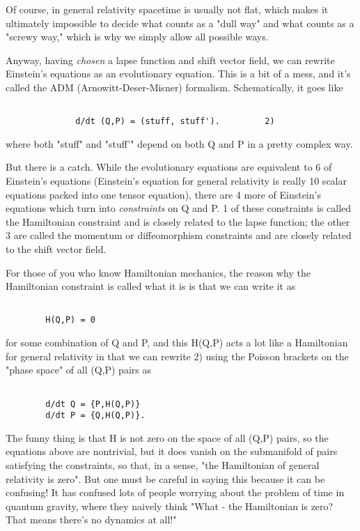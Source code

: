 Of course, in general relativity spacetime is usually not flat, which
makes it ultimately impossible to decide what counts as a "dull way" and
what counts as a "screwy way," which is why we simply allow all possible
ways.

Anyway, having \emph{chosen} a lapse function and shift vector field, we can
rewrite Einstein's equations as an evolutionary equation.  This is a bit
of a mess, and it's called the ADM (Arnowitt-Deser-Misner) formalism.
Schematically, it goes like
		


\begin{verbatim}

              d/dt (Q,P) = (stuff, stuff').			2)
\end{verbatim}
    
where both "stuff" and "stuff'" depend on both Q and P in a pretty
complex way.  

But there is a catch.  While the evolutionary equations are equivalent
to 6 of Einstein's equations (Einstein's equation for general relativity
is really 10 scalar equations packed into one tensor equation), there
are 4 more of Einstein's equations which turn into \emph{constraints} on Q
and P.  1 of these constraints is called the Hamiltonian constraint and
is closely related to the lapse function; the other 3 are called the
momentum or diffeomorphism constraints and are closely related to the
shift vector field.  

For those of you who know Hamiltonian mechanics, the reason why the
Hamiltonian constraint is called what it is is that we can write it as 


\begin{verbatim}

		H(Q,P) = 0
\end{verbatim}
    
for some combination of Q and P, and this H(Q,P) acts a lot like a
Hamiltonian for general relativity in that we can rewrite 2) using the
Poisson brackets on the "phase space" of all (Q,P) pairs as


\begin{verbatim}

		d/dt Q = {P,H(Q,P)}
		d/dt P = {Q,H(Q,P)}.
\end{verbatim}
    
The funny thing is that H is not zero on the space of all (Q,P) pairs,
so the equations above are nontrivial, but it does vanish on the submanifold
of pairs satisfying the constraints, so that, in a sense, "the
Hamiltonian of general relativity is zero".  But one must be careful in
saying this because it can be confusing!  It has confused lots of people
worrying about the problem of time in quantum gravity, where they
naively think "What - the Hamiltonian is zero?  That means there's no
dynamics at all!"

